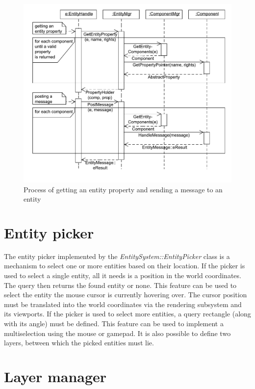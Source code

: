 \documentclass[a4paper, 12pt]{report}
\begin{document}
\begin{figure}[htbp]
	\centering
		\includegraphics[width=1\textwidth]{EntityCommunicationSequence.pdf}
	\caption[The entity communication sequence diagram]{Process of getting an entity property and sending a message to an entity}
	\label{fig:entity-communication-sequence}
\end{figure}

\section{Entity picker}

The entity picker implemented by the \emph{EntitySystem::EntityPicker} class is a mechanism to select one or more entities based on their location. If the picker is used to select a single entity, all it needs is a position in the world coordinates. The query then returns the found entity or none. This feature can be used to select the entity the mouse cursor is currently hovering over. The cursor position must be translated into the world coordinates via the rendering subsystem and its viewports. If the picker is used to select more entities, a query rectangle (along with its angle) must be defined. This feature can be used to implement a multiselection using the mouse or gamepad. It is also possible to define two layers, between which the picked entities must lie.

\section{Layer manager}
\end{document}
